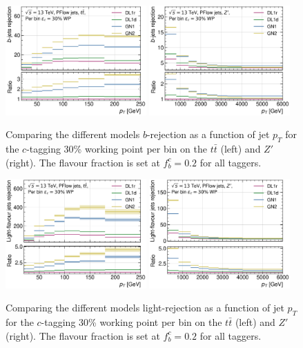 \begin{figure}[h!]
  \centering
  \includegraphics[width=0.48\textwidth]{Images/FTAG/GN/GN2/pt_plots/pt_ttbar_flat_b_rej_c.png}
  \includegraphics[width=0.48\textwidth]{Images/FTAG/GN/GN2/pt_plots/pt_zp_flat_b_rej_c.png}
  \caption{Comparing the different models $b$-rejection as a function of jet $p_T$ for the $c$-tagging 30\% working point per bin on the $t\bar{t}$ (left) and $Z'$ (right). The flavour fraction is set at $f^c_b = 0.2$ for all taggers.}
  \label{fig:GNxptc_brejflat}
\end{figure} 

\begin{figure}[h!]
  \centering
  \includegraphics[width=0.48\textwidth]{Images/FTAG/GN/GN2/pt_plots/pt_ttbar_flat_light_rej_c.png}
  \includegraphics[width=0.48\textwidth]{Images/FTAG/GN/GN2/pt_plots/pt_zp_flat_light_rej_c.png}
  \caption{Comparing the different models light-rejection as a function of jet $p_T$ for the $c$-tagging 30\% working point per bin on the $t\bar{t}$ (left) and $Z'$ (right). The flavour fraction is set at $f^c_b = 0.2$ for all taggers.}
  \label{fig:GNxptc_urejflat}
\end{figure} 

